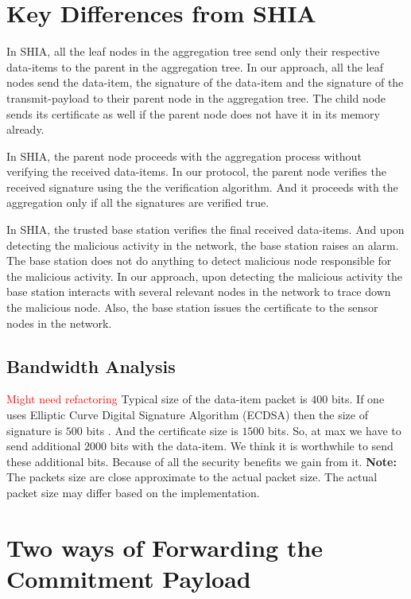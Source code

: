 \section{Key Differences from SHIA}

	In SHIA, all the leaf nodes in the aggregation tree send only their respective data-items to the parent in the aggregation tree.
	In our approach, all the leaf nodes send the data-item, the signature of the data-item and the signature of the transmit-payload to their parent node in the aggregation tree. 
	The child node sends its certificate as well if the parent node does not have it in its memory already.

	In SHIA, the parent node proceeds with the aggregation process without verifying the received data-items.
	In our protocol, the parent node verifies the received signature using the the verification algorithm.
	And it proceeds with the aggregation only if all the signatures are verified true.

	In SHIA, the trusted base station verifies the final received data-items.
	And upon detecting the malicious activity in the network, the base station raises an alarm. 
	The base station does not do anything to detect malicious node responsible for the malicious activity.
	In our approach, upon detecting the malicious activity the base station interacts with several relevant nodes in the network to trace down the malicious node.
	Also, the base station issues the certificate to the sensor nodes in the network.
	
	\subsection{Bandwidth Analysis}
	
		\textcolor{red}{Might need refactoring}
		Typical size of the data-item packet is $400$ bits.
		If one uses Elliptic Curve Digital Signature Algorithm (ECDSA) then the size of signature is $500$ bits \cite{ecdsa2009186}.
		And the certificate size is $1500$ bits.
		So, at max we have to send additional $2000$ bits with the data-item.
		We think it is worthwhile to send these additional bits.
		Because of all the security benefits we gain from it. 
		\textbf{Note:} The packets size are close approximate to the actual packet size. 
		The actual packet size may differ based on the implementation.

\section{Two ways of Forwarding the Commitment Payload}	
	
